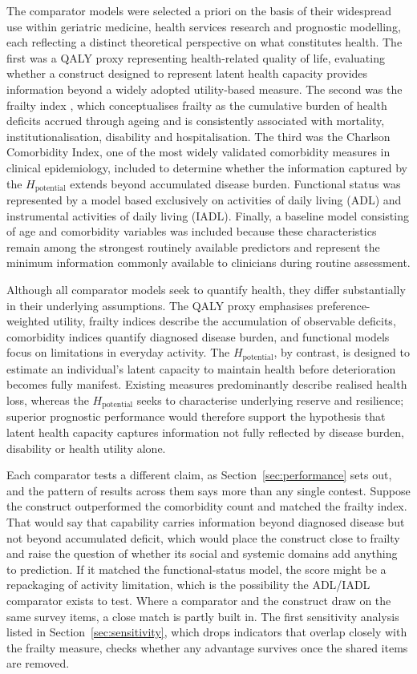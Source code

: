 The comparator models were selected a priori on the basis of their widespread use within geriatric medicine, health services research and prognostic modelling, each reflecting a distinct theoretical perspective on what constitutes health. The first was a QALY proxy representing health-related quality of life, evaluating whether a construct designed to represent latent health capacity provides information beyond a widely adopted utility-based measure. The second was the frailty index \citep{rockwood_mitnitski_2007,searle_2008}, which conceptualises frailty as the cumulative burden of health deficits accrued through ageing and is consistently associated with mortality, institutionalisation, disability and hospitalisation. The third was the Charlson Comorbidity Index, one of the most widely validated comorbidity measures in clinical epidemiology, included to determine whether the information captured by the $H_{\text{potential}}$ extends beyond accumulated disease burden. Functional status was represented by a model based exclusively on activities of daily living (ADL) and instrumental activities of daily living (IADL). Finally, a baseline model consisting of age and comorbidity variables was included because these characteristics remain among the strongest routinely available predictors and represent the minimum information commonly available to clinicians during routine assessment.

Although all comparator models seek to quantify health, they differ substantially in their underlying assumptions. The QALY proxy emphasises preference-weighted utility, frailty indices describe the accumulation of observable deficits, comorbidity indices quantify diagnosed disease burden, and functional models focus on limitations in everyday activity. The $H_{\text{potential}}$, by contrast, is designed to estimate an individual's latent capacity to maintain health before deterioration becomes fully manifest. Existing measures predominantly describe realised health loss, whereas the $H_{\text{potential}}$ seeks to characterise underlying reserve and resilience; superior prognostic performance would therefore support the hypothesis that latent health capacity captures information not fully reflected by disease burden, disability or health utility alone.

Each comparator tests a different claim, as Section~\ref{sec:performance} sets out, and the pattern of results across them says more than any single contest. Suppose the construct outperformed the comorbidity count and matched the frailty index. That would say that capability carries information beyond diagnosed disease but not beyond accumulated deficit, which would place the construct close to frailty and raise the question of whether its social and systemic domains add anything to prediction. If it matched the functional-status model, the score might be a repackaging of activity limitation, which is the possibility the ADL/IADL comparator exists to test. Where a comparator and the construct draw on the same survey items, a close match is partly built in. The first sensitivity analysis listed in Section~\ref{sec:sensitivity}, which drops indicators that overlap closely with the frailty measure, checks whether any advantage survives once the shared items are removed.

